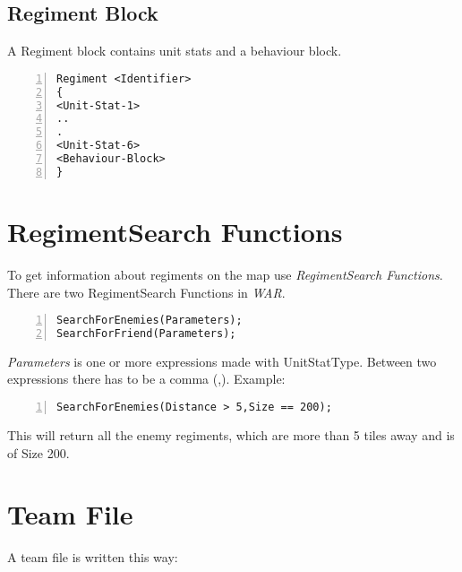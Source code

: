 	\subsection{Regiment Block}
		A Regiment block contains unit stats and a behaviour block.

		\begin{lstlisting}[basicstyle=\small\sffamily,
		keywordstyle={\color{blue}},
		comment={[l]{//}}, morecomment={[s]{/*}{*/}}, commentstyle=\itshape,
		columns={[l]flexible}, numbers=left, numberstyle=\tiny,
		frameround=fftt, frame=shadowbox, captionpos=b,
		caption={Regiment block}]
Regiment <Identifier>
{
<Unit-Stat-1>
..
.
<Unit-Stat-6>
<Behaviour-Block>
}
		\end{lstlisting}
\section{RegimentSearch Functions}
\label{sec:regimentSearch}
	To get information about regiments on the map use {\it RegimentSearch Functions}. There are two RegimentSearch Functions in \textit{WAR}.\\

		\begin{lstlisting}[basicstyle=\small\sffamily,
		keywordstyle={\color{blue}},
		comment={[l]{//}}, morecomment={[s]{/*}{*/}}, commentstyle=\itshape,
		columns={[l]flexible}, numbers=left, numberstyle=\tiny,
		frameround=fftt, frame=shadowbox, captionpos=b,
		caption={RegimentSearch Functions}]
SearchForEnemies(Parameters);
SearchForFriend(Parameters);
	\end{lstlisting}
	{\it Parameters} is one or more expressions made with UnitStatType. Between two expressions there has to be a comma (,).
	Example: \\

		\begin{lstlisting}[basicstyle=\small\sffamily,
		keywordstyle={\color{blue}},
		comment={[l]{//}}, morecomment={[s]{/*}{*/}}, commentstyle=\itshape,
		columns={[l]flexible}, numbers=left, numberstyle=\tiny,
		frameround=fftt, frame=shadowbox, captionpos=b,
		caption={Functions with parameters}]
SearchForEnemies(Distance > 5,Size == 200);
	\end{lstlisting}
	This will return all the enemy regiments, which are more than 5 tiles away and is of Size 200.		
\section{Team File}
\label{doc:teamfile}
	A team file is written this way: \\

